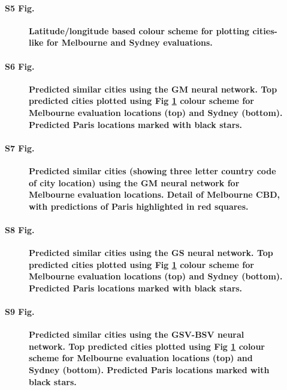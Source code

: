 \documentclass[10pt,letterpaper]{article}
\begin{document}
\paragraph*{S5 Fig.}
\begin{figure}[!htbp]
\centering    
\caption{\bf Latitude/longitude based colour scheme for plotting cities-like for Melbourne and Sydney evaluations.}    
 \label{fig:colorscheme}  
\end{figure} 

\paragraph*{S6 Fig.}
\begin{figure}[!htbp]
\centering   
\caption{\bf Predicted similar cities using the GM neural network. Top predicted cities plotted using Fig \ref{fig:colorscheme} colour scheme for Melbourne evaluation locations (top) and Sydney (bottom). Predicted Paris locations marked with black stars.}    
 \label{fig:melmaps}  
\end{figure} 


\paragraph*{S7 Fig.}
\begin{figure}[!htbp]
\centering     
\caption{\bf Predicted similar cities (showing three letter country code of city location) using the GM neural network for Melbourne evaluation locations. Detail of Melbourne CBD, with predictions of Paris highlighted in red squares.}    
 \label{fig:melmapscbd}  
\end{figure} 

\paragraph*{S8 Fig.}
\begin{figure}[!htbp]
\centering    
\caption{\bf Predicted similar cities using the GS neural network. Top predicted cities plotted using Fig \ref{fig:colorscheme} colour scheme for Melbourne evaluation locations (top) and Sydney (bottom). Predicted Paris locations marked with black stars.} 
 \label{fig:melsat}  
\end{figure} 

\paragraph*{S9 Fig.}
\begin{figure}[!htbp]
\centering    
\caption{\bf Predicted similar cities using the GSV-BSV neural network. Top predicted cities plotted using Fig \ref{fig:colorscheme} colour scheme for Melbourne evaluation locations (top) and Sydney (bottom). Predicted Paris locations marked with black stars.}   
 \label{fig:melstreet}  
\end{figure}
\end{document}
